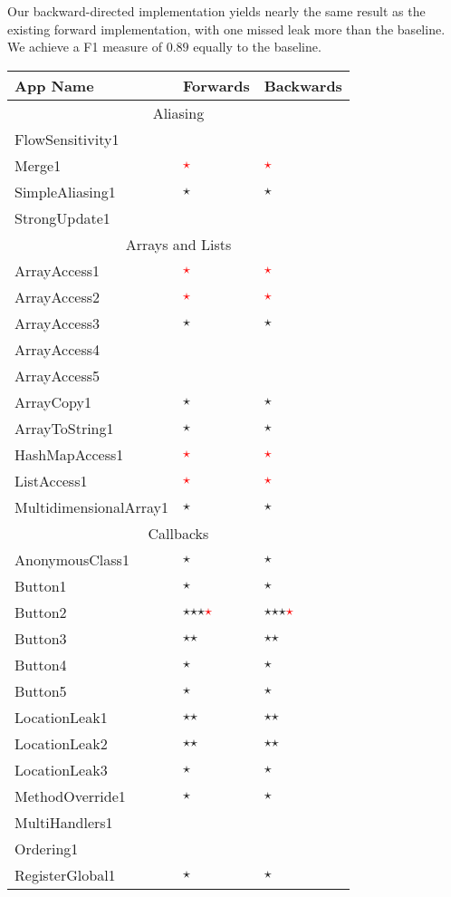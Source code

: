 \documentclass[../draft.tex]{subfiles}
\newcommand{\fp}{\textcolor{white}{\textcircled{\textcolor{red}{$\star$}}}}
\newcommand{\tp}[0]{\textcircled{$\star$}}
\newcommand{\tsub}[1]{\multicolumn{3}{c}{#1}\\\hline}
\begin{document}
    Our backward-directed implementation yields nearly the same result as the existing forward implementation, with one missed leak more than the baseline. We achieve a F1 measure of $0.89$ equally to the baseline.

    \begin{longtable}{l | l | l}%
        \textbf{App Name} & \textbf{Forwards} & \textbf{Backwards}\\
        \hline\hline
        \endhead
        \tsub{Aliasing}
        FlowSensitivity1 & &\\
        Merge1 & \fp & \fp\\
        SimpleAliasing1 & \tp & \tp\\
        StrongUpdate1 & &\\
        \hline
        \tsub{Arrays and Lists}
        ArrayAccess1 & \fp & \fp\\
        ArrayAccess2 & \fp & \fp\\
        ArrayAccess3 & \tp & \tp\\
        ArrayAccess4 &  & \\
        ArrayAccess5 &  & \\
        ArrayCopy1 & \tp & \tp\\
        ArrayToString1 & \tp & \tp\\
        HashMapAccess1 & \fp & \fp\\
        ListAccess1 & \fp & \fp\\
        MultidimensionalArray1 & \tp & \tp\\
        \hline
        \tsub{Callbacks}
        AnonymousClass1 & \tp & \tp\\
        Button1 & \tp & \tp \\
        Button2 & \tp \tp \tp \fp & \tp \tp \tp \fp\\
        Button3 & \tp \tp & \tp \tp\\
        Button4 & \tp & \tp\\
        Button5 & \tp & \tp\\
        LocationLeak1 & \tp \tp & \tp \tp\\
        LocationLeak2 & \tp \tp & \tp \tp\\
        LocationLeak3 & \tp & \tp\\
        MethodOverride1 & \tp & \tp\\
        MultiHandlers1 & & \\
        Ordering1 & & \\
        RegisterGlobal1 & \tp & \tp\\

\end{longtable}
\end{document}
